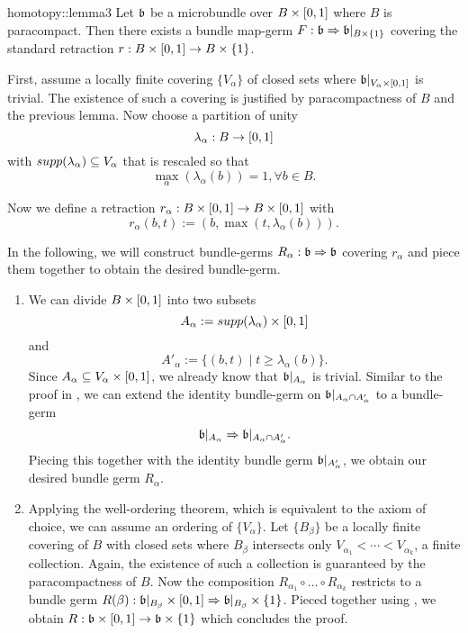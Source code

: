 \begin{scope}
\begin{mylemma}{homotopy::lemma3}
    Let $\bb$ be a microbundle over $B \times \I$ where $B$ is paracompact.
    Then there exists a bundle map-germ $\germdef{F}{\bb}{\bb\restr{B \times \{1\}}}$
    covering the standard retraction $r: B \times \I \to B \times \{1\}$.
\end{mylemma}
\begin{myproof}
    First, assume a locally finite covering $\{V_\alpha\}$ of closed sets where $\bb\restr{V_\alpha \times \I}$ is trivial.
    The existence of such a covering is justified by paracompactness of $B$ and the previous lemma.
    Now choose a partition of unity
    \[ \lambda_\alpha: B \to \I \]
    with $\\supp(\lambda_\alpha) \sub V_\alpha$ that is rescaled so that
    \[ \max_{\alpha}(\lambda_\alpha(b)) = 1, \forall b \in B. \]
    
    Now we define a retraction $r_\alpha: B \times \I \to B \times \I$ with
    \[ r_\alpha(b, t) := (b, \max(t, \lambda_\alpha(b))). \]

    In the following, we will construct bundle-germs $R_\alpha: \bb \double \bb$ covering $r_\alpha$
    and piece them together to obtain the desired bundle-germ.
    \begin{enumerate}
        \item 
        We can divide $B \times \I$ into two subsets
        \[ A_\alpha := \\supp(\lambda_\alpha) \times \I \]
        and
        \[ A'_\alpha := \{(b, t) \mid t \ge \lambda_\alpha(b)\}. \]
        Since $A_\alpha \sub V_\alpha \times \I$, we already know that $\bb\restr{A_\alpha}$ is trivial.
        Similar to the proof in , we can extend the identity bundle-germ on $\bb\restr{\A \cap \A[']}$ to a bundle-germ
        \[ \bb\restr{\A} \double \bb\restr{\A \cap \A[']}. \]
        Piecing this together with the identity bundle germ $\bb\restr{\A[']}$, we obtain our desired bundle germ $R_\alpha$.
        
        \item
        Applying the well-ordering theorem, which is equivalent to the axiom of choice, we can assume an ordering of $\{ V_\alpha \}$.
        Let $\{B_\beta\}$ be a locally finite covering of $B$ with closed sets where $B_\beta$ intersects only $V_{\alpha_1} < \cdots < V_{\alpha_k}$, a finite collection.
        Again, the existence of such a collection is guaranteed by the paracompactness of $B$. 
        Now the composition $R_{\alpha_1} \circ \ldots \circ R_{\alpha_k}$ restricts to a bundle germ $R(\beta): \bb\restr{B_\beta} \times \I \double \bb\restr{B_\beta} \times \{1\}$.
        Pieced together using , we obtain $R: \bb \times \I\to \bb \times \{1\}$ which concludes the proof.
    \end{enumerate}    
\end{myproof}


\end{scope}
